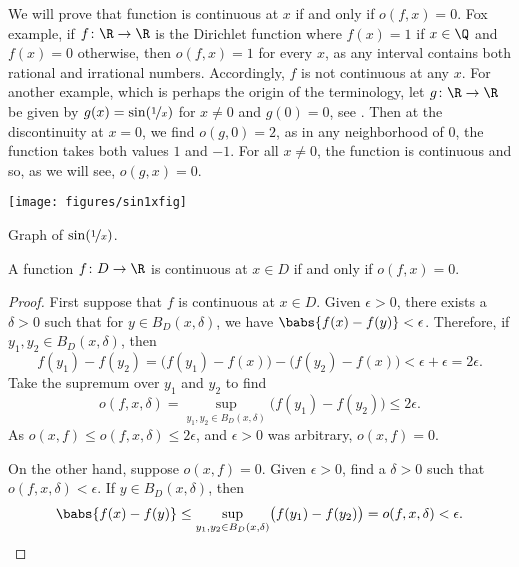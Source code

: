 We will prove that function is continuous at $x$ if and only if $o(f,x) = 0$.
Fox example, if $f \colon \R \to \R$ is the Dirichlet function where
$f(x)=1$ if $x \in \Q$ and $f(x)=0$ otherwise, then $o(f,x) = 1$ for every
$x$, as any interval contains both rational and irrational numbers.
Accordingly, $f$ is not continuous at any $x$.
For another example, which is perhaps the origin of the terminology,
let $g \colon \R \to \R$ be given by
$g(x) = \sin(\nicefrac{1}{x})$ for $x\neq 0$ and $g(0)=0$,
see .
Then at the discontinuity at $x=0$, we find $o(g,0) = 2$, as
in any neighborhood of $0$, the function takes both values $1$ and $-1$.
For all $x \neq 0$, the function is continuous and so, as we will see,
$o(g,x) = 0$.

\begin{myfigureht}
\texttt{[image: figures/sin1xfig]}
\caption{Graph of $\sin(\nicefrac{1}{x})$.\label{fig:sin1xosc}}
\end{myfigureht}

\begin{prop}
\pagebreak[2]
A function
$f \colon D \to \R$ is continuous at $x \in D$ if and only if $o(f,x) = 0$.
\end{prop}

\begin{proof}
First suppose that $f$ is continuous at $x \in D$.  Given $\epsilon > 0$,
there exists a $\delta > 0$ such that for $y \in B_D(x,\delta)$,
we have $\babs{f(x)-f(y)} < \epsilon$.  Therefore, if $y_1,y_2 \in
B_D(x,\delta)$, then
\begin{equation*}
f(y_1)-f(y_2) =
\bigl(f(y_1)-f(x)\bigr)-\bigl(f(y_2)-f(x)\bigr) < \epsilon + \epsilon = 2 \epsilon .
\end{equation*}
Take the supremum over $y_1$ and $y_2$ to find
\begin{equation*}
o(f,x,\delta) = 
\sup_{y_1,y_2 \in B_D(x,\delta)} \bigl(f(y_1)-f(y_2)\bigr)
\leq
2 \epsilon .
\end{equation*}
As $o(x,f) \leq o(f,x,\delta) \leq 2\epsilon$, and $\epsilon > 0$ was arbitrary,
$o(x,f) = 0$.

On the other hand, suppose $o(x,f) = 0$.  Given $\epsilon > 0$,
find a $\delta > 0$ such that $o(f,x,\delta) < \epsilon$.  If
$y \in B_D(x,\delta)$, then
\begin{equation*}
\babs{f(x)-f(y)}
\leq
\sup_{y_1,y_2 \in B_D(x,\delta)} \bigl(f(y_1)-f(y_2)\bigr)
=
o(f,x,\delta) < \epsilon. \qedhere
\end{equation*}
\end{proof}

